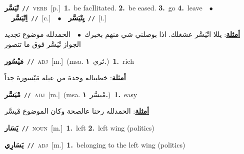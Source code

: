 \documentclass[10pt,a4paper,twoside]{article} %
\begin{document}
\begin{multicols}{2}
{\setlength\topsep{0pt}\textbf{\foreignlanguage{arabic}{تْيَسَّر}}\ {\color{gray}\texttt{//}\color{black}}\ \textsc{verb}\ [p.]\ \textbf{1.}~be facIlitated.  \textbf{2.}~be eased.  \textbf{3.}~go  \textbf{4.}~leave\ \ $\bullet$\ \ \setlength\topsep{0pt}\textbf{\foreignlanguage{arabic}{اِتْيَسَّر}}\ {\color{gray}\texttt{//}\color{black}}\ [c.]\ \ $\bullet$\ \ \setlength\topsep{0pt}\textbf{\foreignlanguage{arabic}{يِتْيَسَّر}}\ {\color{gray}\texttt{//}\color{black}}\ [i.]\  \begin{flushright}\color{gray}\foreignlanguage{arabic}{\textbf{\underline{\foreignlanguage{arabic}{أمثلة}}}: يللا اتْيَسَّر عشغلك. اذا بوصلني شي منهم بخبرك\ $\bullet$\ \  الحمدلله موضوع تجديد الجواز تْيَسَّر فوق ما تتصور}\end{flushright}\color{black}} \vspace{2mm}

{\setlength\topsep{0pt}\textbf{\foreignlanguage{arabic}{مَيْسُور}}\ {\color{gray}\texttt{//}\color{black}}\ \textsc{adj}\ [m.]\ \color{gray}(msa. \foreignlanguage{arabic}{ثري}~\foreignlanguage{arabic}{\textbf{١.}})\color{black}\ \textbf{1.}~rich\  \begin{flushright}\color{gray}\foreignlanguage{arabic}{\textbf{\underline{\foreignlanguage{arabic}{أمثلة}}}: خطبناله وحدة من عيلة مَيْسورة جداً}\end{flushright}\color{black}} \vspace{2mm}

{\setlength\topsep{0pt}\textbf{\foreignlanguage{arabic}{مْيَسَّر}}\ {\color{gray}\texttt{//}\color{black}}\ \textsc{adj}\ [m.]\ \color{gray}(msa. \foreignlanguage{arabic}{مْيسَّر}~\foreignlanguage{arabic}{\textbf{١.}})\color{black}\ \textbf{1.}~easy\  \begin{flushright}\color{gray}\foreignlanguage{arabic}{\textbf{\underline{\foreignlanguage{arabic}{أمثلة}}}: الحمدلله رحنا عالصحة وكان الموضوع مْيسَّر}\end{flushright}\color{black}} \vspace{2mm}

{\setlength\topsep{0pt}\textbf{\foreignlanguage{arabic}{يَسَار}}\ {\color{gray}\texttt{//}\color{black}}\ \textsc{noun}\ [m.]\ \textbf{1.}~left  \textbf{2.}~left wing (politics)\ } \vspace{2mm}

{\setlength\topsep{0pt}\textbf{\foreignlanguage{arabic}{يَسَارِي}}\ {\color{gray}\texttt{//}\color{black}}\ \textsc{adj}\ [m.]\ \textbf{1.}~belonging to the left wing (politics)\ } \vspace{2mm}


\end{multicols}
\end{document}
